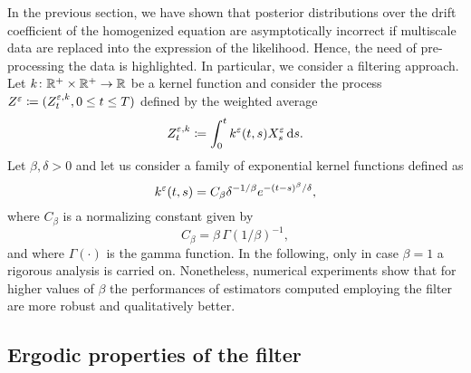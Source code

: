 \documentclass[10pt]{article}
\begin{document}
In the previous section, we have shown that posterior distributions over the drift coefficient of the homogenized equation are asymptotically incorrect if multiscale data are replaced into the expression of the likelihood. Hence, the need of pre-processing the data is highlighted. In particular, we consider a filtering approach. Let $k \colon \mathbb{R}^+ \times \mathbb{R}^+ \to \mathbb{R}$ be a kernel function and consider the process $Z^\varepsilon \coloneqq (Z^{\varepsilon,k}_t, 0 \leq t \leq T)$ defined by the weighted average
\begin{equation}\label{eq:ZDef}
	Z^{\varepsilon,k}_t \coloneqq \int_0^t k^\varepsilon(t, s)X^\varepsilon_s \,\mathrm{d} s.
\end{equation}
Let $\beta, \delta > 0$ and let us consider a family of exponential kernel functions defined as
\begin{equation}
	k^\varepsilon(t, s) = C_\beta \delta^{-1/\beta} e^{-(t-s)^\beta/\delta},
\end{equation}
where $C_{\beta}$ is a normalizing constant given by
\begin{equation}
	C_\beta = \beta \, \Gamma(1/\beta)^{-1},
\end{equation}
and where $\Gamma(\cdot)$ is the gamma function. In the following, only in case $\beta = 1$ a rigorous analysis is carried on. Nonetheless, numerical experiments show that for higher values of $\beta$ the performances of estimators computed employing the filter are more robust and qualitatively better. 


\subsection{Ergodic properties of the filter}\label{sec:ergodic}
\end{document}
